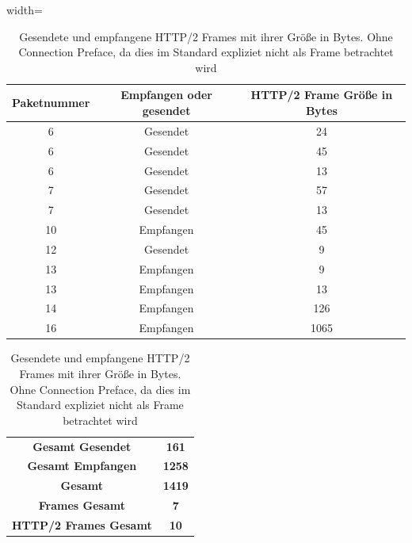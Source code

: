 \begin{table}
    \centering
    \begin{adjustbox}{width=\textwidth}
        \begin{minipage}{\textwidth}
            \centering
            \begin{tabular}{|c|c|c|}
                \hline
                \textbf{Paketnummer} & \textbf{Empfangen oder gesendet} & \textbf{HTTP/2 Frame Größe in Bytes} \\
                \hline
                6 & Gesendet & 24 \\
                6 & Gesendet & 45 \\
                6 & Gesendet & 13 \\
                7 & Gesendet & 57 \\
                7 & Gesendet & 13 \\
                10 & Empfangen & 45 \\
                12 & Gesendet & 9 \\
                13 & Empfangen & 9 \\
                13 & Empfangen & 13 \\
                14 & Empfangen & 126 \\
                16 & Empfangen & 1065 \\
                \hline
            \end{tabular}

            \vspace{0.2cm}

            \begin{tabular}{|c|c|}
                \hline
                \textbf{Gesamt Gesendet} & \textbf{161} \\
                \textbf{Gesamt Empfangen} & \textbf{1258} \\
                \textbf{Gesamt} & \textbf{1419} \\
                \textbf{Frames Gesamt} & \textbf{7} \\
                \textbf{HTTP/2 Frames Gesamt} & \textbf{10} \\
                \hline
            \end{tabular}
        \end{minipage}
    \end{adjustbox}
    \caption{Gesendete und empfangene HTTP/2 Frames mit ihrer Größe in Bytes. Ohne Connection Preface, da dies im Standard \cite{rfc9113_http2_headers} expliziet nicht als Frame betrachtet wird}\label{tab:packet_size}
\end{table}

